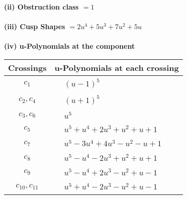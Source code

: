 \documentclass[1p]{elsarticle_modified}
\theoremstyle{definition}
\begin{document}
\flushleft \textbf{(ii) Obstruction class $= 1$}\\~\\
\flushleft \textbf{(iii) Cusp Shapes $= 2 u^4+5 u^3+7 u^2+5 u$}\\~\\
\newpage\renewcommand{\arraystretch}{1}
\flushleft \textbf{(iv) u-Polynomials at the component}\newline \\
\begin{tabular}{m{50pt}|m{274pt}}
Crossings & \hspace{64pt}u-Polynomials at each crossing \\
\hline $$\begin{aligned}c_{1}\end{aligned}$$&$\begin{aligned}
&(u-1)^5
\end{aligned}$\\
\hline $$\begin{aligned}c_{2},c_{4}\end{aligned}$$&$\begin{aligned}
&(u+1)^5
\end{aligned}$\\
\hline $$\begin{aligned}c_{3},c_{6}\end{aligned}$$&$\begin{aligned}
&u^5
\end{aligned}$\\
\hline $$\begin{aligned}c_{5}\end{aligned}$$&$\begin{aligned}
&u^5+u^4+2 u^3+u^2+u+1
\end{aligned}$\\
\hline $$\begin{aligned}c_{7}\end{aligned}$$&$\begin{aligned}
&u^5-3 u^4+4 u^3- u^2- u+1
\end{aligned}$\\
\hline $$\begin{aligned}c_{8}\end{aligned}$$&$\begin{aligned}
&u^5- u^4-2 u^3+u^2+u+1
\end{aligned}$\\
\hline $$\begin{aligned}c_{9}\end{aligned}$$&$\begin{aligned}
&u^5- u^4+2 u^3- u^2+u-1
\end{aligned}$\\
\hline $$\begin{aligned}c_{10},c_{11}\end{aligned}$$&$\begin{aligned}
&u^5+u^4-2 u^3- u^2+u-1
\end{aligned}$\\
\hline
\end{tabular}\\~\\
\end{document}
